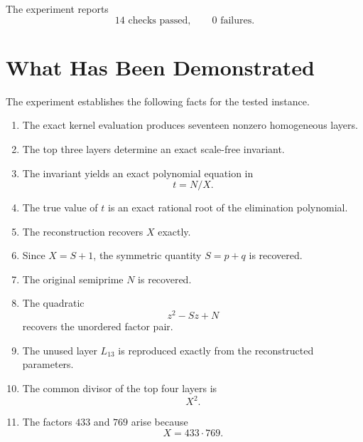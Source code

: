 \documentclass[11pt,a4paper]{article}
\theoremstyle{definition}
\theoremstyle{remark}
\begin{document}
The experiment reports
\begin{equation}
\boxed{
14\text{ checks passed},\qquad
0\text{ failures}.
}
\end{equation}

\section{What Has Been Demonstrated}

The experiment establishes the following facts for the tested instance.

\begin{enumerate}[label=(\roman*)]
    \item The exact kernel evaluation produces seventeen nonzero
    homogeneous layers.

    \item The top three layers determine an exact scale-free invariant.

    \item The invariant yields an exact polynomial equation in
    \[
    t=N/X.
    \]

    \item The true value of $t$ is an exact rational root of the
    elimination polynomial.

    \item The reconstruction recovers $X$ exactly.

    \item Since $X=S+1$, the symmetric quantity $S=p+q$ is recovered.

    \item The original semiprime $N$ is recovered.

    \item The quadratic
    \[
    z^2-Sz+N
    \]
    recovers the unordered factor pair.

    \item The unused layer $L_{13}$ is reproduced exactly from the
    reconstructed parameters.

    \item The common divisor of the top four layers is
    \[
    X^2.
    \]

    \item The factors $433$ and $769$ arise because
    \[
    X=433\cdot769.
    \]
\end{enumerate}
\end{document}
